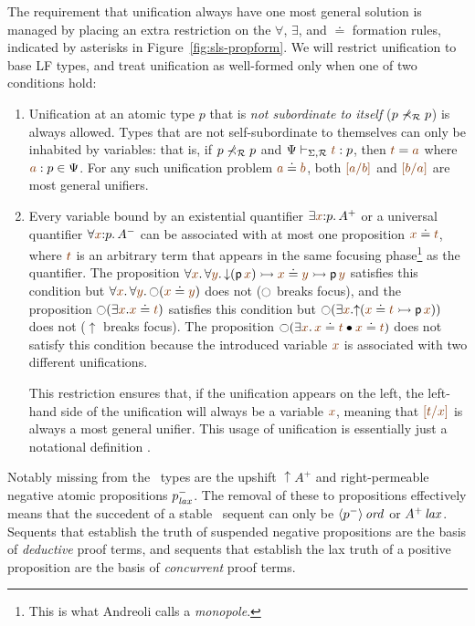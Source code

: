 The requirement that unification always have one most general solution
is managed by placing an extra restriction on the $\forall$, 
$\exists$, and $\doteq$ formation rules, indicated by asterisks in
Figure~\ref{fig:sls-propform}. We will restrict unification to 
base LF types, and treat unification as well-formed only when one 
of two conditions hold:
\smallskip
\begin{enumerate}
\item Unification at an atomic type $p$ that is {\it not
subordinate to itself} ($p \not\prec_\mathcal R p$) is always allowed. 
Types that are not self-subordinate to themselves can only be inhabited
by variables: that is, if $p \not\prec_\mathcal R p$ and 
$\Psi \vdash_{\Sigma,\subord} \lf{t} : p$, then $\lf{t} = \lf{{a}}$
where $\lf{a}:p \in \Psi$. For any such unification problem 
$\lf{{a}} \doteq \lf{{b}}$, both 
$\lf{[{a}/b]}$ and $\lf{[{b}/a]}$ are most
general unifiers.
\item Every variable bound by an existential quantifier 
$\exists \lf{x}{:}p.\,A^+$ or a universal quantifier 
$\forall \lf{x}{:}p.\,A^-$ can be associated with at most one 
proposition $\lf{x} \doteq \lf{t}$, where $\lf{t}$ is an arbitrary 
term that appears in the same focusing
phase\footnote{This is what Andreoli calls a {\it monopole}.} 
as the quantifier. 
The proposition 
$\forall \lf{x}.\, 
 \forall \lf{y}.\, {\downarrow}({\sf p}\,\lf{x}) 
   \lefti \lf{x} \doteq \lf{y} 
   \lefti {\sf p}\,\lf{y}$ satisfies this condition but
$\forall \lf{x}.\,\forall \lf{y}.\,{\ocircle}(\lf{x} \doteq \lf{y})$ does not 
($\ocircle$ breaks focus), and the proposition 
${\ocircle}(\exists \lf{x}. \lf{x} \doteq \lf{t})$ satisfies this condition
but
${\ocircle}(\exists \lf{x}. 
  {\uparrow}(\lf{x} \doteq \lf{t} \lefti {\sf p}\,\lf{x}))$
does not (${\uparrow}$ breaks focus).
The proposition
${\ocircle}(\exists \lf{x}.\, 
\lf{x} \doteq \lf{t} \fuse \lf{x} \doteq \lf{t})$ 
does not satisfy this condition because the introduced variable $\lf{x}$ is 
associated with two different unifications. 

This restriction ensures that, if
the unification appears on the left, the left-hand side of the unification
will always be a variable
$\lf{x}$, meaning that $\lf{[t/x]}$ is always a most general unifier.
This usage of unification is essentially just a notational
definition \cite{pfenning99algorithms}.
\end{enumerate}
\smallskip

Notably missing from the \sls~types are the upshift ${\uparrow}A^+$
and right-permeable negative atomic propositions $p^-_{\it lax}$. The
removal of these to propositions effectively means that the succedent
of a stable \sls~sequent can only be ${\langle {p^-} \rangle}\,{{\it ord}}$ or
${A^+}\,{{\it lax}}$. Sequents that establish the truth of suspended negative
propositions are the basis of {\it deductive} proof terms, and
sequents that establish the lax truth of a positive proposition are
the basis of {\it concurrent} proof terms. 

